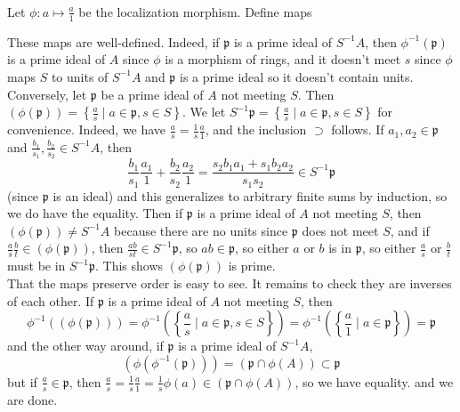 \documentclass{article}
\newcommand{\p}{\mathfrak{p}}
\newcommand{\exercise}{\subsubsection} %
\begin{document}
\exercise{} Let $\phi : a \mapsto \frac{a}{1}$ be the localization morphism. Define maps
\begin{center}
\end{center}

These maps are well-defined. Indeed, if $\p$ is a prime ideal of $S^{-1}A$, then $\phi^{-1}(\p)$ is a prime ideal of $A$ since $\phi$ is a morphism of rings, and it doesn't meet $s$ since $\phi$ maps $S$ to units of $S^{-1}A$ and $\p$ is a prime ideal so it doesn't contain units. Conversely, let $\p$ be a prime ideal of $A$ not meeting $S$. Then $(\phi(\p)) = \left\{\frac{a}{s} \mid a \in \p, s\in S\right\}$. We let $S^{-1}\p = \left\{\frac{a}{s} \mid a \in \p, s\in S\right\}$ for convenience. Indeed, we have $\frac{a}{s} = \frac{1}{s}\frac{a}{1}$, and the inclusion $\supset$ follows. If $a_1,a_2 \in \p$ and $\frac{b_1}{s_1}, \frac{b_2}{s_2} \in S^{-1}A$, then
\[\frac{b_1}{s_1}\frac{a_1}{1} + \frac{b_2}{s_2}\frac{a_2}{1} = \frac{s_2 b_1 a_1 + s_1 b_2 a_2}{s_1 s_2} \in S^{-1}\p\]
(since $\p$ is an ideal) and this generalizes to arbitrary finite sums by induction, so we do have the equality. Then if $\p$ is a prime ideal of $A$ not meeting $S$, then $(\phi(\p)) \ne S^{-1}A$ because there are no units since $\p$ does not meet $S$, and if $\frac{a}{s} \frac{b}{t} \in (\phi(\p))$, then $\frac{ab}{st} \in S^{-1}\p$, so $ab \in \p$, so either $a$ or $b$ is in $\p$, so either $\frac{a}{s}$ or $\frac{b}{t}$ must be in $S^{-1}\p$. This shows $(\phi(\p))$ is prime. \\
That the maps preserve order is easy to see. It remains to check they are inverses of each other. If $\p$ is a prime ideal of $A$ not meeting $S$, then
\[\phi^{-1}((\phi(\p))) = \phi^{-1}\left(\left\{\frac{a}{s} \mid a \in \p, s\in S\right\}\right) = \phi^{-1}\left(\left\{\frac{a}{1} \mid a \in \p\right\}\right) = \p\]
and the other way around, if $\p$ is a prime ideal of $S^{-1}A$,
\[(\phi(\phi^{-1}(\p))) = (\p \cap \phi(A)) \subset \p\]
but if $\frac{a}{s} \in \p$, then $\frac{a}{s} = \frac{1}{s} \frac{a}{1} = \frac{1}{s} \phi(a) \in (\p \cap \phi(A))$, so we have equality.
and we are done.
\end{document}
